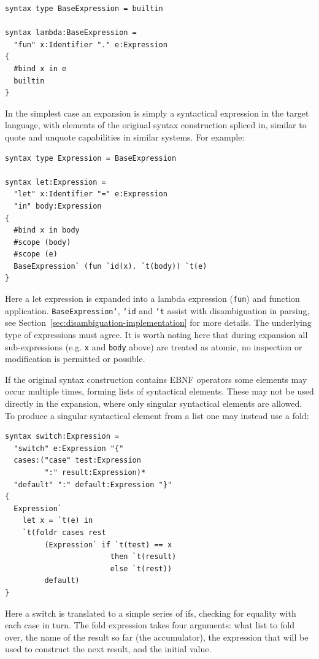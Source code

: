 \documentclass{kththesis}
\begin{document}
\begin{verbatim}
syntax type BaseExpression = builtin

syntax lambda:BaseExpression =
  "fun" x:Identifier "." e:Expression
{
  #bind x in e
  builtin
}
\end{verbatim}

In the simplest case an expansion is simply a syntactical expression in the target language, with elements of the original syntax construction spliced in, similar to quote and unquote capabilities in similar systems. For example:

\begin{verbatim}
syntax type Expression = BaseExpression

syntax let:Expression =
  "let" x:Identifier "=" e:Expression
  "in" body:Expression
{
  #bind x in body
  #scope (body)
  #scope (e)
  BaseExpression` (fun `id(x). `t(body)) `t(e)
}
\end{verbatim}

Here a let expression is expanded into a lambda expression (\texttt{fun}) and function application. \texttt{BaseExpression`}, \texttt{`id} and \texttt{`t} assist with disambiguation in parsing, see Section~\ref{sec:disambiguation-implementation} for more details. The underlying type of expressions must agree. It is worth noting here that during expansion all sub-expressions (e.g. \texttt{x} and \texttt{body} above) are treated as atomic, no inspection or modification is permitted or possible.

If the original syntax construction contains EBNF operators some elements may occur multiple times, forming lists of syntactical elements. These may not be used directly in the expansion, where only singular syntactical elements are allowed. To produce a singular syntactical element from a list one may instead use a fold:

\begin{verbatim}
syntax switch:Expression =
  "switch" e:Expression "{"
  cases:("case" test:Expression
         ":" result:Expression)*
  "default" ":" default:Expression "}"
{
  Expression`
    let x = `t(e) in
    `t(foldr cases rest
         (Expression` if `t(test) == x
                        then `t(result)
                        else `t(rest))
         default)
}
\end{verbatim}

Here a switch is translated to a simple series of ifs, checking for equality with each case in turn. The fold expression takes four arguments: what list to fold over, the name of the result so far (the accumulator), the expression that will be used to construct the next result, and the initial value.
\end{document}
